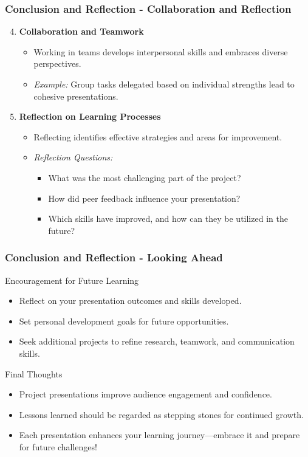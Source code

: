 \documentclass{beamer}
\begin{document}
\begin{frame}[fragile]
    \frametitle{Conclusion and Reflection - Collaboration and Reflection}
    \begin{enumerate}
        \setcounter{enumi}{3}
        \item \textbf{Collaboration and Teamwork}
        \begin{itemize}
            \item Working in teams develops interpersonal skills and embraces diverse perspectives.
            \item \textit{Example:} Group tasks delegated based on individual strengths lead to cohesive presentations.
        \end{itemize}

        \item \textbf{Reflection on Learning Processes}
        \begin{itemize}
            \item Reflecting identifies effective strategies and areas for improvement.
            \item \textit{Reflection Questions:}
            \begin{itemize}
                \item What was the most challenging part of the project?
                \item How did peer feedback influence your presentation?
                \item Which skills have improved, and how can they be utilized in the future?
            \end{itemize}
        \end{itemize}
    \end{enumerate}
\end{frame}

\begin{frame}[fragile]
    \frametitle{Conclusion and Reflection - Looking Ahead}
    \begin{block}{Encouragement for Future Learning}
        \begin{itemize}
            \item Reflect on your presentation outcomes and skills developed.
            \item Set personal development goals for future opportunities.
            \item Seek additional projects to refine research, teamwork, and communication skills.
        \end{itemize}
    \end{block}

    \begin{block}{Final Thoughts}
        \begin{itemize}
            \item Project presentations improve audience engagement and confidence.
            \item Lessons learned should be regarded as stepping stones for continued growth.
            \item Each presentation enhances your learning journey—embrace it and prepare for future challenges!
        \end{itemize}
    \end{block}
\end{frame}
\end{document}
